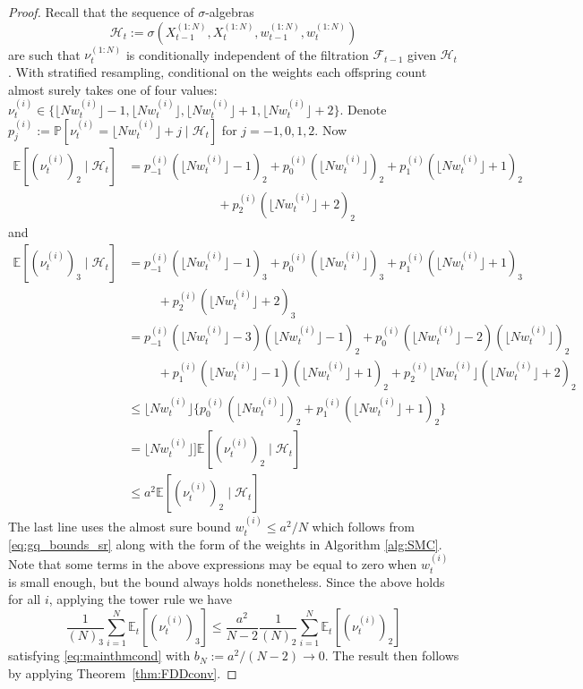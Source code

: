 \documentclass{article}
\theoremstyle{definition}
\newcommand{\Prob}{\mathbb{P}}
\newcommand{\E}{\mathbb{E}}
\newcommand{\Et}{\mathbb{E}_t}
\newcommand{\1}[1]{\mathbbm{1}_{#1}} %
\newcommand{\flnw}[1][i]{\lfloor N w_t^{(#1)} \rfloor}
\begin{document}
\begin{proof}
Recall that the sequence of $\sigma$-algebras
\begin{equation}\label{eq:defn_Ht}
\mathcal{H}_t := \sigma(X_{t-1}^{(1:N)}, X_t^{(1:N)}, w_{t-1}^{(1:N)}, w_t^{(1:N)} )
\end{equation}
are such that $\nu_t^{(1:N)}$ is conditionally independent of the filtration $\mathcal{F}_{t-1}$ given $\mathcal{H}_t$.
With stratified resampling, conditional on the weights each offspring count almost surely takes one of four values: $\nu_t^{(i)} \in \{ \flnw -1, \flnw, \flnw +1, \flnw +2 \}$.  
Denote $p_j^{(i)} := \Prob[ \nu_t^{(i)} = \flnw +j \mid \mathcal{H}_t ]$ for $j=-1,0,1,2$.
Now
\begin{align*}
\E [(\nu_t^{(i)})_2 \mid \mathcal{H}_t ]
&= p_{-1}^{(i)} (\flnw -1)_2 + p_0^{(i)} (\flnw)_2 + p_1^{(i)} (\flnw +1)_2 \\
    &\hspace{3cm} + p_2^{(i)} (\flnw +2)_2
\end{align*}
and
\begin{align*}
\E [(\nu_t^{(i)})_3 \mid \mathcal{H}_t ]
&= p_{-1}^{(i)} (\flnw -1)_3 + p_0^{(i)} (\flnw)_3 + p_1^{(i)} (\flnw +1)_3 \\
    &\hspace{1cm} + p_2^{(i)} (\flnw +2)_3 \\
&= p_{-1}^{(i)} (\flnw -3)(\flnw -1)_2 + p_0^{(i)} (\flnw -2)(\flnw)_2 \\
     &\hspace{1cm} + p_1^{(i)} (\flnw -1)(\flnw +1)_2 
         + p_2^{(i)} \flnw (\flnw +2)_2 \\
&\leq \flnw \{ p_0^{(i)} (\flnw)_2 + p_1^{(i)} (\flnw +1)_2 \} \\
&= \flnw ]\E [(\nu_t^{(i)})_2 \mid \mathcal{H}_t ] \\
&\leq a^2 \E [(\nu_t^{(i)})_2 \mid \mathcal{H}_t ]
\end{align*}
The last line uses the almost sure bound $w_t^{(i)} \leq a^2 /N$ which follows from \eqref{eq:gq_bounds_sr} along with the form of the weights in Algorithm \ref{alg:SMC}.
Note that some terms in the above expressions may be equal to zero when $w_t^{(i)}$ is small enough, but the bound always holds nonetheless.
Since the above holds for all $i$, applying the tower rule we have
\begin{equation*}
\frac{1}{(N)_3} \sum_{i=1}^{N} \Et [(\nu_t^{(i)})_3 ]
\leq \frac{a^2}{N-2} \frac{1}{(N)_2} \sum_{i=1}^{N} \Et [(\nu_t^{(i)})_2 ]
\end{equation*}
satisfying \eqref{eq:mainthmcond} with $b_N := a^2/(N-2) \rightarrow 0$.
The result then follows by applying Theorem~\ref{thm:FDDconv}.
\end{proof}
\end{document}

